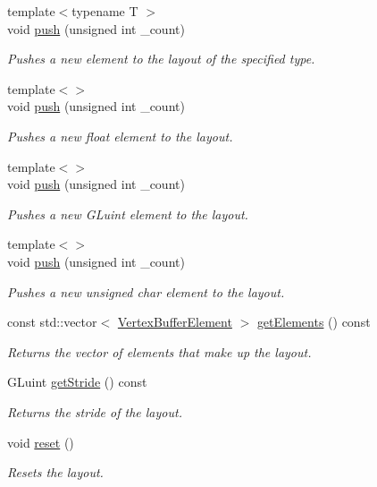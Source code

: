 \begin{DoxyCompactItemize}
\item 
{\footnotesize template$<$typename T $>$ }\\void \hyperlink{class_cookie_eng_1_1_graphics_1_1_vertex_buffer_layout_a8d9958c85411d75d7f412b2d3f7b566a}{push} (unsigned int \+\_\+count)
\begin{DoxyCompactList}\small\item\em Pushes a new element to the layout of the specified type. \end{DoxyCompactList}\item 
{\footnotesize template$<$$>$ }\\void \hyperlink{class_cookie_eng_1_1_graphics_1_1_vertex_buffer_layout_a3f1a639714762ec45edf48a68995d7bd}{push} (unsigned int \+\_\+count)
\begin{DoxyCompactList}\small\item\em Pushes a new float element to the layout. \end{DoxyCompactList}\item 
{\footnotesize template$<$$>$ }\\void \hyperlink{class_cookie_eng_1_1_graphics_1_1_vertex_buffer_layout_a3f1a639714762ec45edf48a68995d7bd}{push} (unsigned int \+\_\+count)
\begin{DoxyCompactList}\small\item\em Pushes a new G\+Luint element to the layout. \end{DoxyCompactList}\item 
{\footnotesize template$<$$>$ }\\void \hyperlink{class_cookie_eng_1_1_graphics_1_1_vertex_buffer_layout_a3f1a639714762ec45edf48a68995d7bd}{push} (unsigned int \+\_\+count)
\begin{DoxyCompactList}\small\item\em Pushes a new unsigned char element to the layout. \end{DoxyCompactList}\item 
const std\+::vector$<$ \hyperlink{struct_cookie_eng_1_1_graphics_1_1_vertex_buffer_element}{Vertex\+Buffer\+Element} $>$ \hyperlink{class_cookie_eng_1_1_graphics_1_1_vertex_buffer_layout_a082cc08b182cabe19998ae522c0466be}{get\+Elements} () const
\begin{DoxyCompactList}\small\item\em Returns the vector of elements that make up the layout. \end{DoxyCompactList}\item 
G\+Luint \hyperlink{class_cookie_eng_1_1_graphics_1_1_vertex_buffer_layout_a4c771d06898767d1a92237b03a53e887}{get\+Stride} () const
\begin{DoxyCompactList}\small\item\em Returns the stride of the layout. \end{DoxyCompactList}\item 
void \hyperlink{class_cookie_eng_1_1_graphics_1_1_vertex_buffer_layout_a9e511f18b0895825ff8ea2b567f89626}{reset} ()
\begin{DoxyCompactList}\small\item\em Resets the layout. \end{DoxyCompactList}\end{DoxyCompactItemize}
